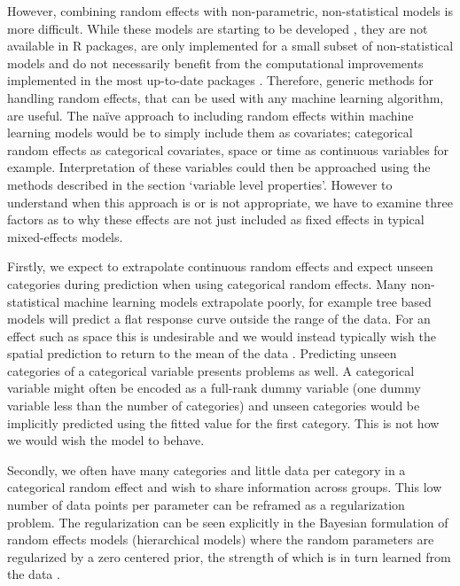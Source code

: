 \documentclass[12pt]{article}
\begin{document}
However, combining random effects with non-parametric, non-statistical models is more difficult.
While these models are starting to be developed \citep{ngufor2019mixed, hajjem2014mixed, hajjem2017generalized, eo2014tree, miller2017gradient, REEMtree}, they are not available in R packages, are only implemented for a small subset of non-statistical models and do not necessarily benefit from the computational improvements implemented in the most up-to-date packages \citep{wright2015ranger, xgboost}.
Therefore, generic methods for handling random effects, that can be used with any machine learning algorithm, are useful.
The na\"{i}ve approach to including random effects within machine learning models would be to simply include them as covariates; categorical random effects as categorical covariates, space or time as continuous variables for example.
Interpretation of these variables could then be approached using the methods described in the section `variable level properties'.
However to understand when this approach is or is not appropriate, we have to examine three factors as to why these effects are not just included as fixed effects in typical mixed-effects models.

Firstly, we expect to extrapolate continuous random effects and expect unseen categories during prediction when using categorical random effects.
Many non-statistical machine learning models extrapolate poorly, for example tree based models will predict a flat response curve outside the range of the data.
For an effect such as space this is undesirable and we would instead typically wish the spatial prediction to return to the mean of the data \citep{rasmussen2004gaussian, hengl2018random}.
Predicting unseen categories of a categorical variable presents problems as well.
A categorical variable might often be encoded as a full-rank dummy variable (one dummy variable less than the number of categories) and unseen categories would be implicitly predicted using the fitted value for the first category.
This is not how we would wish the model to behave.

Secondly, we often have many categories and little data per category in a categorical random effect and wish to share information across groups.
This low number of data points per parameter can be reframed as a regularization problem.
The regularization can be seen explicitly in the Bayesian formulation of random effects models (hierarchical models) where the random parameters are regularized by a zero centered prior, the strength of which is in turn learned from the data \citep{simpson2017penalising}.
\end{document}
